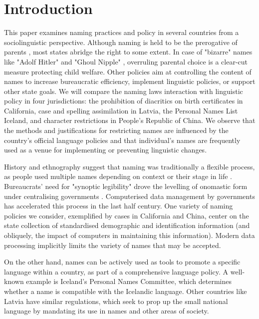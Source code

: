 \section{Introduction}

This paper examines naming practices and policy in several countries from a
sociolinguistic perspective. Although naming is held to be the prerogative of
parents \parencite{alford87}, most states abridge the right to some extent. In
case of "bizarre" names like "Adolf Hitler" and "Ghoul Nipple"
\parencite{larson11}, overruling parental choice is a clear-cut measure
protecting child welfare. Other policies aim at controlling the content of
names to increase bureaucratic efficiency, implement linguistic policies, or
support other state goals. We will compare the naming laws interaction with
linguistic policy in four jurisdictions: the prohibition of diacritics on birth
certificates in California, case and spelling assimilation in Latvia, the
Personal Names List Iceland, and character restrictions in People's Republic of
China. We observe that the methods and justifications for restricting names are
influenced by the country's official language policies and that individual's
names are frequently used as a venue for implementing or preventing linguistic
changes.

History and ethnography suggest that naming was traditionally a flexible
process, as people used multiple names depending on context or their stage in
life \parencite{alford87} \parencite{scott02}. Bureaucrats' need for "synoptic
legibility" drove the levelling of onomastic form under centralising
governments \parencite{scott02}. Computerised data management by governments
has accelerated this process in the last half century. One variety of naming
policies we consider, exemplified by cases in California and China, center on
the state collection of standardised demographic and identification information
(and obliquely, the impact of computers in maintaining this information).
Modern data processing implicitly limits the variety of names that may be
accepted.

On the other hand, names can be actively used as tools to promote a specific
language within a country, as part of a comprehensive language policy. A
well-known example is Iceland's Personal Names Committee, which determines
whether a name is compatible with the Icelandic language. Other countries like
Latvia have similar regulations, which seek to prop up the small national
language by mandating its use in names and other areas of society.

